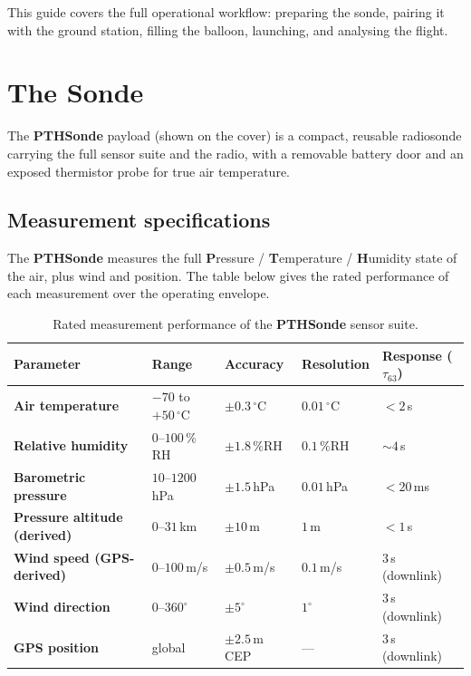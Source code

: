 \documentclass[11pt,openany]{report}
\newcommand{\PTH}{\texorpdfstring{\textbf{PTH}\textcolor{tlorange}{\textbf{Sonde}}}{PTHSonde}}
\begin{document}
\begin{note}
This guide covers the full operational workflow: preparing the sonde, pairing it
with the ground station, filling the balloon, launching, and analysing the flight.
\end{note}

\chapter{The Sonde}

The \PTH{} payload (shown on the cover) is a compact, reusable radiosonde carrying the
full sensor suite and the radio, with a removable battery door and an exposed thermistor
probe for true air temperature.

\section{Measurement specifications}
The \PTH{} measures the full \textbf{P}ressure / \textbf{T}emperature /
\textbf{H}umidity state of the air, plus wind and position. The table below gives the
rated performance of each measurement over the operating envelope.

\begin{table}[H]
\centering\small
\setlength{\tabcolsep}{6pt}
\renewcommand{\arraystretch}{1.35}
\begin{tabular}{@{}>{\bfseries}l l l l l@{}}
\toprule
\rowcolor{tlorange!22}
\textbf{Parameter} & \textbf{Range} & \textbf{Accuracy} & \textbf{Resolution} & \textbf{Response ($\tau_{63}$)} \\
\midrule
Air temperature & $-70$ to $+50\,^\circ$C & $\pm0.3\,^\circ$C & $0.01\,^\circ$C & $<2$\,s \\
\rowcolor{tllight}
Relative humidity & $0$--$100\,\%$RH & $\pm1.8\,\%$RH & $0.1\,\%$RH & $\sim4$\,s \\
Barometric pressure & $10$--$1200$\,hPa & $\pm1.5$\,hPa & $0.01$\,hPa & $<20$\,ms \\
\rowcolor{tllight}
Pressure altitude (derived) & $0$--$31$\,km & $\pm10$\,m & $1$\,m & $<1$\,s \\
Wind speed (GPS-derived) & $0$--$100$\,m/s & $\pm0.5$\,m/s & $0.1$\,m/s & $3$\,s (downlink) \\
\rowcolor{tllight}
Wind direction & $0$--$360^\circ$ & $\pm5^\circ$ & $1^\circ$ & $3$\,s (downlink) \\
GPS position & global & $\pm2.5$\,m CEP & --- & $3$\,s (downlink) \\
\bottomrule
\end{tabular}
\caption{Rated measurement performance of the \PTH{} sensor suite.}
\end{table}
\end{document}
